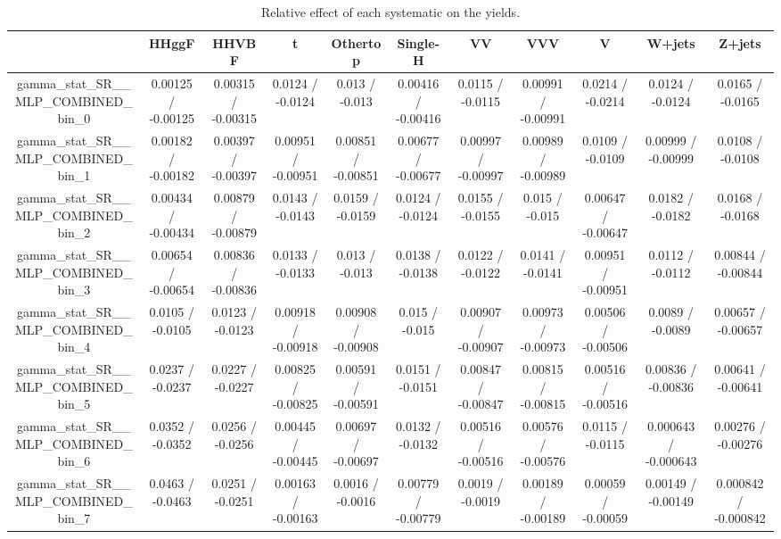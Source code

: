\documentclass[10pt]{article}
\begin{document}
\begin{table}[htbp]
\begin{center}
\begin{tabular}{|c|c|c|c|c|c|c|c|c|c|c|}
\hline 
      & HHggF      & HHVBF      & t      & Othertop      & Single-H      & VV      & VVV      & V      & W+jets      & Z+jets \\ 
\hline 
  gamma_stat_SR__MLP_COMBINED_bin_0 & 0.00125 / -0.00125 & 0.00315 / -0.00315 & 0.0124 / -0.0124 & 0.013 / -0.013 & 0.00416 / -0.00416 & 0.0115 / -0.0115 & 0.00991 / -0.00991 & 0.0214 / -0.0214 & 0.0124 / -0.0124 & 0.0165 / -0.0165 \\ 
  gamma_stat_SR__MLP_COMBINED_bin_1 & 0.00182 / -0.00182 & 0.00397 / -0.00397 & 0.00951 / -0.00951 & 0.00851 / -0.00851 & 0.00677 / -0.00677 & 0.00997 / -0.00997 & 0.00989 / -0.00989 & 0.0109 / -0.0109 & 0.00999 / -0.00999 & 0.0108 / -0.0108 \\ 
  gamma_stat_SR__MLP_COMBINED_bin_2 & 0.00434 / -0.00434 & 0.00879 / -0.00879 & 0.0143 / -0.0143 & 0.0159 / -0.0159 & 0.0124 / -0.0124 & 0.0155 / -0.0155 & 0.015 / -0.015 & 0.00647 / -0.00647 & 0.0182 / -0.0182 & 0.0168 / -0.0168 \\ 
  gamma_stat_SR__MLP_COMBINED_bin_3 & 0.00654 / -0.00654 & 0.00836 / -0.00836 & 0.0133 / -0.0133 & 0.013 / -0.013 & 0.0138 / -0.0138 & 0.0122 / -0.0122 & 0.0141 / -0.0141 & 0.00951 / -0.00951 & 0.0112 / -0.0112 & 0.00844 / -0.00844 \\ 
  gamma_stat_SR__MLP_COMBINED_bin_4 & 0.0105 / -0.0105 & 0.0123 / -0.0123 & 0.00918 / -0.00918 & 0.00908 / -0.00908 & 0.015 / -0.015 & 0.00907 / -0.00907 & 0.00973 / -0.00973 & 0.00506 / -0.00506 & 0.0089 / -0.0089 & 0.00657 / -0.00657 \\ 
  gamma_stat_SR__MLP_COMBINED_bin_5 & 0.0237 / -0.0237 & 0.0227 / -0.0227 & 0.00825 / -0.00825 & 0.00591 / -0.00591 & 0.0151 / -0.0151 & 0.00847 / -0.00847 & 0.00815 / -0.00815 & 0.00516 / -0.00516 & 0.00836 / -0.00836 & 0.00641 / -0.00641 \\ 
  gamma_stat_SR__MLP_COMBINED_bin_6 & 0.0352 / -0.0352 & 0.0256 / -0.0256 & 0.00445 / -0.00445 & 0.00697 / -0.00697 & 0.0132 / -0.0132 & 0.00516 / -0.00516 & 0.00576 / -0.00576 & 0.0115 / -0.0115 & 0.000643 / -0.000643 & 0.00276 / -0.00276 \\ 
  gamma_stat_SR__MLP_COMBINED_bin_7 & 0.0463 / -0.0463 & 0.0251 / -0.0251 & 0.00163 / -0.00163 & 0.0016 / -0.0016 & 0.00779 / -0.00779 & 0.0019 / -0.0019 & 0.00189 / -0.00189 & 0.00059 / -0.00059 & 0.00149 / -0.00149 & 0.000842 / -0.000842 \\ 
\hline 
\end{tabular} 
\caption{Relative effect of each systematic on the yields.} 
\end{center} 
\end{table} 
\end{document}
